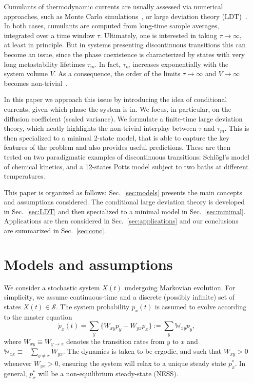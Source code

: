 \documentclass[aps,pre,reprint, amsmath, amssymb,superscriptaddress]{revtex4-1}
\begin{document}
Cumulants of thermodynamic currents are usually assessed  via numerical approaches, such as Monte Carlo simulations~\cite{Noa2019}, or large deviation theory (LDT)~\cite{Nguyen2020,Levitov1993,Flindt2009,Touchette2009,Esposito2009,Koza1999}.
In both cases, cumulants are computed from long-time sample averages, integrated over a time window $\tau$.
Ultimately, one is interested in taking $\tau \to \infty$, at least in principle. 
But in systems presenting discontinuous 
transitions this can become an issue, since the phase coexistence is characterized by states with very long metastability lifetimes $\tau_m$.
In fact, $\tau_m$  increases exponentially with the system volume $V$. 
As a consequence, the order of the limits  $\tau\to\infty$ and $V\to\infty$ becomes non-trivial~\cite{Baras1997}. 

In this paper we approach this issue by introducing the idea of conditional currents, given which phase the system is in. 
We focus, in particular, on the diffusion coefficient (scaled variance). 
We formulate a finite-time large deviation theory, which neatly highlights the non-trivial interplay between $\tau$ and $\tau_m$. 
This is then specialized to a minimal 2-state model, that is able to capture the key features of the problem and also provides useful predictions. 
These are then tested on two  paradigmatic examples of discontinuous transitions:
Schl\"ogl's model of chemical kinetics, and a  12-states Potts model subject to two baths at different temperatures. 

This paper is organized as follows: Sec.~\ref{sec:models} presents
the main concepts and assumptions considered.
The conditional large deviation theory is developed in Sec.~\ref{sec:LDT} and then specialized to a minimal model in Sec.~\ref{sec:minimal}. 
Applications are then considered in Sec.~\ref{sec:applications} and our conclusions are summarized in Sec.~\ref{sec:conc}.


%
%
\section{\label{sec:models}Models and assumptions}
%
%

We consider a stochastic system $X(t)$ undergoing Markovian evolution. 
For simplicity, we assume continuous-time and a discrete (possibly infinite) set of states $X(t) \in \mathcal{S}$. 
The system probability $p_x(t)$ is assumed to evolve according to the master equation~\cite{VanKampen2007}
\begin{equation}\label{M}
    \dot{p}_x(t) = \sum\limits_y \big\{W_{xy} p_y - W_{yx} p_x\big\} := \sum\limits_y \mathbb{W}_{xy} p_y,
\end{equation}
where $W_{xy} \equiv W_{y\to x}$ denotes the transition rates  from $y$ to $x$  and $\mathbb{W}_{xx} \equiv - \sum_{y\neq x} W_{yx}$.
The dynamics is taken to be ergodic, and such that $W_{xy}>0$ whenever $W_{yx}>0$, ensuring the system will relax to a unique steady state $p_x^*$.
In general, $p_x^*$ will be a non-equilibrium steady-state (NESS).
\end{document}

